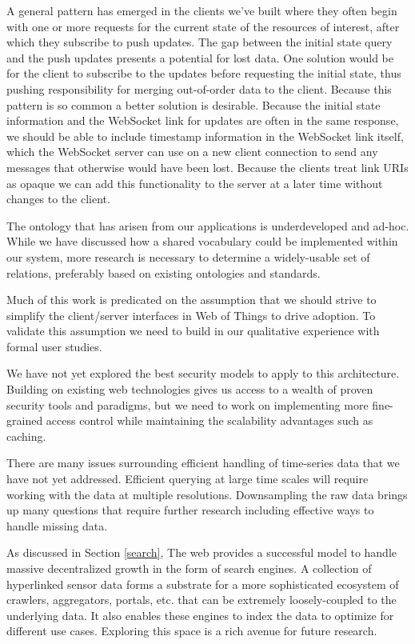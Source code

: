 \documentclass{acm_proc_article-sp}
\begin{document}
A general pattern has emerged in the clients we've built where they often begin
with one or more requests for the current state of the resources of interest,
after which they subscribe to push updates. The gap between the initial state
query and the push updates presents a potential for lost data. One solution
would be for the client to subscribe to the updates before requesting the
initial state, thus pushing responsibility for merging out-of-order data to the
client. Because this pattern is so common a better solution is desirable.
Because the initial state information and the WebSocket link for updates are
often in the same response, we should be able to include timestamp information
in the WebSocket link itself, which the WebSocket server can use on a new
client connection to send any messages that otherwise would have been lost.
Because the clients treat link URIs as opaque we can add this functionality to
the server at a later time without changes to the client.

The ontology that has arisen from our applications is underdeveloped and
ad-hoc. While we have discussed how a shared vocabulary could be implemented
within our system, more research is necessary to determine a widely-usable set
of relations, preferably based on existing ontologies and standards.

Much of this work is predicated on the assumption that we should strive to
simplify the client/server interfaces in Web of Things to drive adoption. To
validate this assumption we need to build in our qualitative experience with
formal user studies.

We have not yet explored the best security models to apply to this
architecture. Building on existing web technologies gives us access to a wealth
of proven security tools and paradigms, but we need to work on implementing
more fine-grained access control while maintaining the scalability advantages
such as caching.

There are many issues surrounding efficient handling of time-series data that
we have not yet addressed. Efficient querying at large time scales will require
working with the data at multiple resolutions. Downsampling the raw data brings
up many questions that require further research including effective ways to
handle missing data.

As discussed in Section \ref{search}, The web provides a successful model to
handle massive decentralized growth in the form of search engines. A collection
of hyperlinked sensor data forms a substrate for a more sophisticated ecosystem
of crawlers, aggregators, portals, etc. that can be extremely loosely-coupled
to the underlying data. It also enables these engines to index the data to
optimize for different use cases. Exploring this space is a rich avenue for
future research.
\end{document}
